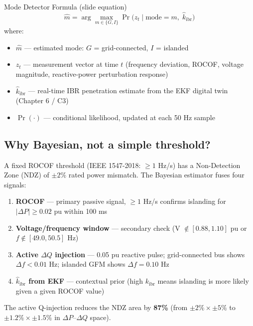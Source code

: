 \documentclass[12pt,a4paper]{article}
\begin{document}
\begin{formulabox}{Mode Detector Formula (slide equation)}
\begin{equation}
  \hat{m} = \arg\max_{m \in \{G, I\}} \Pr\!\bigl(z_t \mid \text{mode}=m,\; \hat{k}_\mathrm{ibr}\bigr)
  \label{eq:bayesian}
\end{equation}
where:
\begin{itemize}[nosep]
  \item $\hat{m}$ — estimated mode: $G$ = grid-connected, $I$ = islanded
  \item $z_t$ — measurement vector at time $t$ (frequency deviation, ROCOF,
        voltage magnitude, reactive-power perturbation response)
  \item $\hat{k}_\mathrm{ibr}$ — real-time IBR penetration estimate from the EKF
        digital twin (Chapter 6 / C3)
  \item $\Pr(\cdot)$ — conditional likelihood, updated at each 50 Hz sample
\end{itemize}
\end{formulabox}

\subsection{Why Bayesian, not a simple threshold?}

A fixed ROCOF threshold (IEEE 1547-2018: $\geq 1$ Hz/s) has a Non-Detection Zone
(NDZ) of $\pm 2\%$ rated power mismatch. The Bayesian estimator fuses four signals:

\begin{enumerate}[nosep]
  \item \textbf{ROCOF} — primary passive signal, $\geq 1$ Hz/s confirms islanding
        for $|\Delta P| \geq 0.02$ pu within 100 ms
  \item \textbf{Voltage/frequency window} — secondary check (V $\notin [0.88,1.10]$
        pu or $f \notin [49.0,50.5]$ Hz)
  \item \textbf{Active $\Delta Q$ injection} — 0.05 pu reactive pulse; grid-connected
        bus shows $\Delta f < 0.01$ Hz; islanded GFM shows $\Delta f = 0.10$ Hz
  \item \textbf{$\hat{k}_\mathrm{ibr}$ from EKF} — contextual prior (high $k_\mathrm{ibr}$
        means islanding is more likely given a given ROCOF value)
\end{enumerate}

The active Q-injection reduces the NDZ area by \textbf{87\%} (from $\pm 2\% \times
\pm 5\%$ to $\pm 1.2\% \times \pm 1.5\%$ in $\Delta P$--$\Delta Q$ space).
\end{document}
